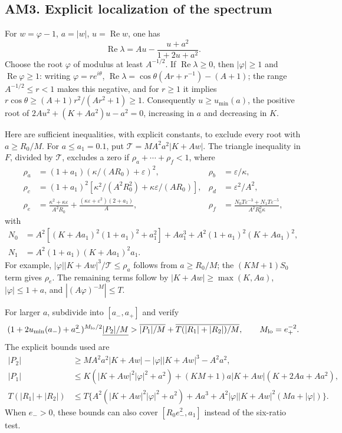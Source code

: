 \subsection{AM3. Explicit localization of the spectrum}
For $w=\varphi-1$, $a=|w|$, $u=\operatorname{Re}w$, one has
\[
 \operatorname{Re}\lambda=Au-\frac{u+a^2}{1+2u+a^2}.
\]
Choose the root $\varphi$ of modulus at least $A^{-1/2}$. If $\operatorname{Re}\lambda\ge0$,
then $|\varphi|\ge1$ and $\operatorname{Re}\varphi\ge1$: writing $\varphi=re^{i\theta}$,
$\operatorname{Re}\lambda=\cos\theta(Ar+r^{-1})-(A+1)$; the range
$A^{-1/2}\le r<1$ makes this negative, and for $r\ge1$ it implies
$r\cos\theta\ge(A+1)r^2/(Ar^2+1)\ge1$.
Consequently $u\ge u_{\min}(a)$, the positive root of
$2Au^2+(K+Aa^2)u-a^2=0$, increasing in $a$ and decreasing in $K$.

Here are sufficient inequalities, with explicit constants, to exclude every root with
$a\ge R_0/M$. For $a\le a_1=0.1$, put $\mathcal T=MA^2a^2|K+Aw|$.
The triangle inequality in $F$, divided by $\mathcal T$, excludes a zero if
$\rho_a+\cdots+\rho_f<1$, where
\begin{align*}
 \rho_a&=(1+a_1)(\kappa/(AR_0)+\varepsilon)^2,& \rho_b&=\varepsilon/\kappa,\\
 \rho_c&=(1+a_1)^2[\kappa^2/(A^2R_0^2)+\kappa\varepsilon/(AR_0)],&
 \rho_d&=\varepsilon^2/A^2,\\
 \rho_e&=\frac{\kappa^2+\kappa\varepsilon}{A^2R_0}
              +\frac{(\kappa\varepsilon+\varepsilon^2)(2+a_1)}A,&
 \rho_f&=\frac{N_0T\varepsilon^{-3}+N_1T\varepsilon^{-5}}{A^2R_0^2\kappa},
\end{align*}
with
\begin{align*}
 N_0&=A^2[(K+Aa_1)^2(1+a_1)^2+a_1^2]+Aa_1^3
                 +A^2(1+a_1)^2(K+Aa_1)^2,\\
 N_1&=A^2(1+a_1)(K+Aa_1)^2a_1.
\end{align*}
For example, $|\varphi||K+Aw|^3/\mathcal T\le\rho_a$ follows from
$a\ge R_0/M$; the $(KM+1)S_0$ term gives $\rho_e$. The remaining terms follow by
$|K+Aw|\ge\max(K,Aa)$, $|\varphi|\le1+a$, and $|(A\varphi)^{-M}|\le T$.

For larger $a$, subdivide into $[a_-,a_+]$ and verify
\[
 (1+2u_{\min}(a_-)+a_-^2)^{M_{\rm lo}/2}\underline{|P_2|/M}
    >\overline{|P_1|/M}+\overline{T(|R_1|+|R_2|)/M},\qquad M_{\rm lo}=e_+^{-2}.
\]
The explicit bounds used are
\begin{align*}
 |P_2|&\ge MA^2a^2|K+Aw|-|\varphi||K+Aw|^3-A^2a^2,\\
 |P_1|&\le K(|K+Aw|^2|\varphi|^2+a^2)+(KM+1)a|K+Aw|(K+2Aa+Aa^2),\\
 T(|R_1|+|R_2|)&\le T\{A^2(|K+Aw|^2|\varphi|^2+a^2)+Aa^3
                       +A^2|\varphi||K+Aw|^2(Ma+|\varphi|)\}.
\end{align*}
When $e_->0$, these bounds can also cover $[R_0e_-^2,a_1]$ instead of the six-ratio test.

